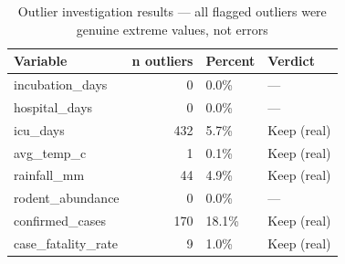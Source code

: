 \begin{table}[htbp]
\caption{Outlier investigation results — all flagged outliers were genuine extreme values, not errors}
\label{tab:outliers}
\begin{tabular}{lrll}
\toprule
Variable & n outliers & Percent & Verdict \\
\midrule
incubation_days & 0 & 0.0\% & — \\
hospital_days & 0 & 0.0\% & — \\
icu_days & 432 & 5.7\% & Keep (real) \\
avg\_temp\_c & 1 & 0.1\% & Keep (real) \\
rainfall\_mm & 44 & 4.9\% & Keep (real) \\
rodent\_abundance & 0 & 0.0\% & — \\
confirmed\_cases & 170 & 18.1\% & Keep (real) \\
case\_fatality\_rate & 9 & 1.0\% & Keep (real) \\
\bottomrule
\end{tabular}
\end{table}

